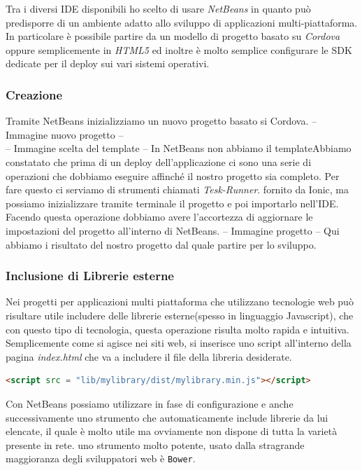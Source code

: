 Tra i diversi IDE disponibili ho scelto di usare \emph{NetBeans} in quanto può predisporre di un ambiente adatto allo sviluppo di applicazioni multi-piattaforma. In particolare è possibile partire da un modello di progetto basato su \emph{Cordova} oppure semplicemente in \emph{HTML5} ed inoltre è molto semplice configurare le SDK dedicate per il deploy sui vari sistemi operativi.

\subsubsection{Creazione}
Tramite NetBeans inizializziamo un nuovo progetto basato si Cordova.
-- Immagine nuovo progetto --\\
-- Immagine scelta del template --
In NetBeans non abbiamo il templateAbbiamo constatato che prima di un deploy dell'applicazione ci sono una serie di operazioni che dobbiamo eseguire affinché il nostro progetto sia completo. Per fare questo ci serviamo di strumenti chiamati \emph{Tesk-Runner}. fornito da Ionic, ma possiamo inizializzare tramite terminale il progetto e poi importarlo nell'IDE. Facendo questa operazione dobbiamo avere l'accortezza di aggiornare le impostazioni del progetto all'interno di NetBeans.
-- Immagine progetto --
Qui abbiamo i risultato del nostro progetto dal quale partire per lo sviluppo.

\subsubsection{Inclusione di Librerie esterne}
Nei progetti per applicazioni multi piattaforma che utilizzano tecnologie web può risultare utile includere delle librerie esterne(spesso in linguaggio Javascript), che con questo tipo di tecnologia, questa operazione risulta molto rapida e intuitiva. \\
Semplicemente come si agisce nei siti web, si inserisce uno script all'interno della pagina \emph{index.html} che va a includere il file della libreria desiderate.

\begin{lstlisting}[language=html]
	<script src = "lib/mylibrary/dist/mylibrary.min.js"></script>
\end{lstlisting}

Con NetBeans possiamo utilizzare in fase di configurazione e anche successivamente uno strumento che automaticamente include librerie da lui elencate, il quale è molto utile ma ovviamente non dispone di tutta la varietà presente in rete. uno strumento molto potente, usato dalla stragrande maggioranza degli sviluppatori web è \texttt{Bower}.

